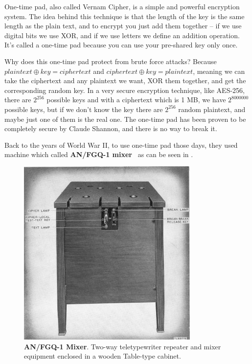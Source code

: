 One-time pad, also called Vernam Cipher, is a simple and powerful encryption
system. The idea behind this technique is that the length of the key is the same
length as the plain text, and to encrypt you just add them together – if we use
digital bits we use XOR, and if we use letters we define an addition operation.
It's called a one-time pad because you can use your pre-shared key only once.

Why does this one-time pad protect from brute force attacks? Because $plaintext
\oplus key = ciphertext$ and $ciphertext \oplus key = plaintext$, meaning we can
take the ciphertext and any plaintext we want, XOR them together, and get the
corresponding random key. In a very secure encryption technique, like AES-256,
there are \(2^{256}\) possible keys and with a ciphertext which is 1 MB, we have
\(2^{8000000}\) possible keys, but if we don't know the key there are
\(2^{256}\) random plaintext, and maybe just one of them is the real one. The
one-time pad has been proven to be completely secure by Claude Shannon, and
there is no way to break it.

Back to the years of World War II, to use one-time pad those days, they used
machine which called \textbf{AN/FGQ-1 mixer}~\cite{cryptoMix} as can be seen in
.

\begin{figure}[!ht]
    \centering
    \includegraphics[width=0.8\textwidth]{images/ch1_Intro/MIxer.jpg}
    \caption{\textbf{AN/FGQ-1 Mixer}. Two-way teletypewriter repeater and mixer equipment enclosed in a wooden Table-type cabinet.} \label{fig:Mixer}
\end{figure}

